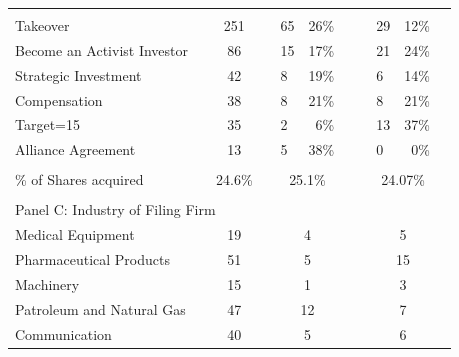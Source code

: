 \documentclass[12pt]{article}
\begin{document}
\begin{adjustwidth}{-6in}{-1in}
\begin{table}[htbp]
\begin{tabular}{lcclccllccc}
			\midrule
					&       &       &       &       &       &       &       &       &       &  \\
			Takeover &       & 251   &       & \multicolumn{1}{l}{65} & \multicolumn{1}{r}{26\%} &       &       & \multicolumn{1}{l}{29} & \multicolumn{1}{r}{12\%} &  \\
			Become an Activist Investor  &       & 86    &       & \multicolumn{1}{l}{15} & \multicolumn{1}{r}{17\%} &       &       & \multicolumn{1}{l}{21} & \multicolumn{1}{r}{24\%} &  \\
			Strategic Investment &       & 42    &       & \multicolumn{1}{l}{8} & \multicolumn{1}{r}{19\%} &       &       & \multicolumn{1}{l}{6} & \multicolumn{1}{r}{14\%} &  \\
			Compensation &       & 38    &       & \multicolumn{1}{l}{8} & \multicolumn{1}{r}{21\%} &       &       & \multicolumn{1}{l}{8} & \multicolumn{1}{r}{21\%} &  \\
			Target=15 &       & 35    &       & \multicolumn{1}{l}{2} & \multicolumn{1}{r}{6\%} &       &       & \multicolumn{1}{l}{13} & \multicolumn{1}{r}{37\%} &  \\
			Alliance Agreement &       & 13    &       & \multicolumn{1}{l}{5} & \multicolumn{1}{r}{38\%} &       &       & \multicolumn{1}{l}{0} & \multicolumn{1}{r}{0\%} &  \\
					&       &       &       &       &       &       &       &       &       &  \\
			\multicolumn{1}{p{15.415em}}{\% of Shares acquired} &       & 24.6\% &       & \multicolumn{2}{c}{25.1\%} &       &       & \multicolumn{2}{c}{24.07\%} &  \\
					&       &       &       &       &       &       &       &       &       &  \\
			\midrule
			\multicolumn{11}{p{37.33em}}{Panel C: Industry of Filing Firm} \\
			\midrule
			Medical Equipment &       & 19    &       & \multicolumn{2}{c}{4} &       &       & \multicolumn{2}{c}{5} &  \\
			Pharmaceutical Products &       & 51    &       & \multicolumn{2}{c}{5} &       &       & \multicolumn{2}{c}{15} &  \\
			Machinery &       & 15    &       & \multicolumn{2}{c}{1} &       &       & \multicolumn{2}{c}{3} &  \\
			Patroleum and Natural Gas &       & 47    &       & \multicolumn{2}{c}{12} &       &       & \multicolumn{2}{c}{7} &  \\
			Communication &       & 40    &       & \multicolumn{2}{c}{5} &       &       & \multicolumn{2}{c}{6} &  \\

\end{tabular}
\end{table}
\end{adjustwidth}
\end{document}
